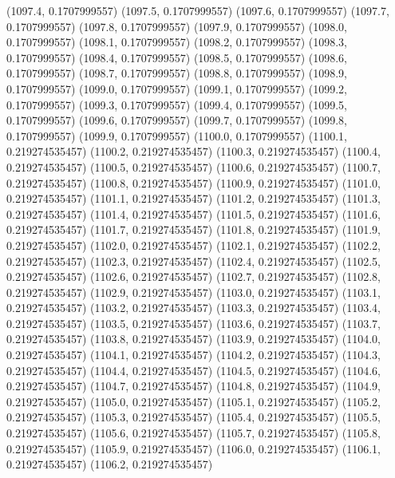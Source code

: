 {					(1097.4, 0.1707999557)
					(1097.5, 0.1707999557)
					(1097.6, 0.1707999557)
					(1097.7, 0.1707999557)
					(1097.8, 0.1707999557)
					(1097.9, 0.1707999557)
					(1098.0, 0.1707999557)
					(1098.1, 0.1707999557)
					(1098.2, 0.1707999557)
					(1098.3, 0.1707999557)
					(1098.4, 0.1707999557)
					(1098.5, 0.1707999557)
					(1098.6, 0.1707999557)
					(1098.7, 0.1707999557)
					(1098.8, 0.1707999557)
					(1098.9, 0.1707999557)
					(1099.0, 0.1707999557)
					(1099.1, 0.1707999557)
					(1099.2, 0.1707999557)
					(1099.3, 0.1707999557)
					(1099.4, 0.1707999557)
					(1099.5, 0.1707999557)
					(1099.6, 0.1707999557)
					(1099.7, 0.1707999557)
					(1099.8, 0.1707999557)
					(1099.9, 0.1707999557)
					(1100.0, 0.1707999557)
					(1100.1, 0.219274535457)
					(1100.2, 0.219274535457)
					(1100.3, 0.219274535457)
					(1100.4, 0.219274535457)
					(1100.5, 0.219274535457)
					(1100.6, 0.219274535457)
					(1100.7, 0.219274535457)
					(1100.8, 0.219274535457)
					(1100.9, 0.219274535457)
					(1101.0, 0.219274535457)
					(1101.1, 0.219274535457)
					(1101.2, 0.219274535457)
					(1101.3, 0.219274535457)
					(1101.4, 0.219274535457)
					(1101.5, 0.219274535457)
					(1101.6, 0.219274535457)
					(1101.7, 0.219274535457)
					(1101.8, 0.219274535457)
					(1101.9, 0.219274535457)
					(1102.0, 0.219274535457)
					(1102.1, 0.219274535457)
					(1102.2, 0.219274535457)
					(1102.3, 0.219274535457)
					(1102.4, 0.219274535457)
					(1102.5, 0.219274535457)
					(1102.6, 0.219274535457)
					(1102.7, 0.219274535457)
					(1102.8, 0.219274535457)
					(1102.9, 0.219274535457)
					(1103.0, 0.219274535457)
					(1103.1, 0.219274535457)
					(1103.2, 0.219274535457)
					(1103.3, 0.219274535457)
					(1103.4, 0.219274535457)
					(1103.5, 0.219274535457)
					(1103.6, 0.219274535457)
					(1103.7, 0.219274535457)
					(1103.8, 0.219274535457)
					(1103.9, 0.219274535457)
					(1104.0, 0.219274535457)
					(1104.1, 0.219274535457)
					(1104.2, 0.219274535457)
					(1104.3, 0.219274535457)
					(1104.4, 0.219274535457)
					(1104.5, 0.219274535457)
					(1104.6, 0.219274535457)
					(1104.7, 0.219274535457)
					(1104.8, 0.219274535457)
					(1104.9, 0.219274535457)
					(1105.0, 0.219274535457)
					(1105.1, 0.219274535457)
					(1105.2, 0.219274535457)
					(1105.3, 0.219274535457)
					(1105.4, 0.219274535457)
					(1105.5, 0.219274535457)
					(1105.6, 0.219274535457)
					(1105.7, 0.219274535457)
					(1105.8, 0.219274535457)
					(1105.9, 0.219274535457)
					(1106.0, 0.219274535457)
					(1106.1, 0.219274535457)
					(1106.2, 0.219274535457)
}
